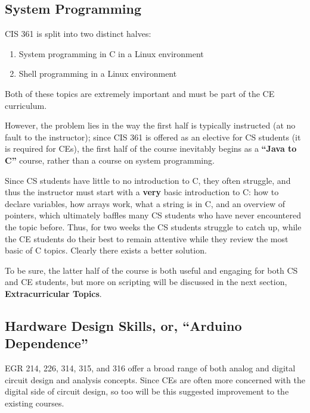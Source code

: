 \documentclass[12pt]{article}
\numberwithin{figure}{section}
\numberwithin{equation}{section}
\begin{document}
{\subsection{System Programming}\label{system-programming}
CIS 361 is split into two distinct halves:

\begin{enumerate}
\itemsep1pt\parskip0pt
\item System programming in C in a Linux environment
\item Shell programming in a Linux environment
\end{enumerate}

Both of these topics are extremely important and must be part of the CE
curriculum.

\bigskip

However, the problem lies in the way the first half is typically
instructed (at no fault to the instructor); since CIS 361 is offered as
an elective for CS students (it is required for CEs), the first half of
the course inevitably begins as a \textbf{``Java to C''} course, rather
than a course on system programming.

\bigskip

Since CS students have little to no introduction to C, they often
struggle, and thus the instructor must start with a \textbf{very} basic
introduction to C: how to declare variables, how arrays work, what a
string is in C, and an overview of pointers, which ultimately baffles
many CS students who have never encountered the topic before. Thus, for
two weeks the CS students struggle to catch up, while the CE students do
their best to remain attentive while they review the most basic of C
topics. Clearly there exists a better solution.

\bigskip

To be sure, the latter half of the course is both useful and engaging
for both CS and CE students, but more on scripting will be discussed in
the next section, \textbf{Extracurricular Topics}.

\subsection{Hardware Design Skills, or, ``Arduino Dependence''}\label{arduino-dependence}
EGR 214, 226, 314, 315, and 316 offer a broad range of both analog and
digital circuit design and analysis concepts. Since CEs are often more
concerned with the digital side of circuit design, so too will be this
suggested improvement to the existing courses.

}
\end{document}
